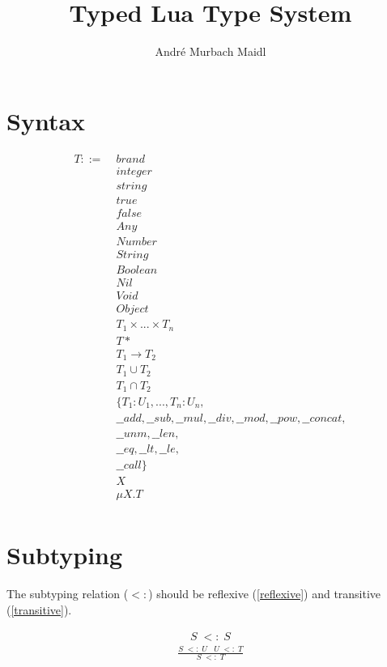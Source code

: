 \documentclass[12pt]{article}
\title{Typed Lua Type System}
\author{André Murbach Maidl}
\begin{document}
\maketitle

\section{Syntax}

\begin{align*}
T ::= \; & brand\\
& integer\\
& string\\
& true\\
& false\\
& Any\\
& Number\\
& String\\
& Boolean\\
& Nil\\
& Void\\
& Object\\
& T_1 \times ... \times T_n\\
& T*\\
& T_1 \rightarrow T_2\\
& T_1 \cup T_2\\
& T_1 \cap T_2\\
& \{ T_1:U_1, ..., T_n:U_n, \\
& \_\_add, \_\_sub, \_\_mul, \_\_div, \_\_mod, \_\_pow, \_\_concat, \\
& \_\_unm, \_\_len, \\
& \_\_eq, \_\_lt, \_\_le, \\
& \_\_call \}\\
& X\\
& \mu X.T\\
\end{align*}

\section{Subtyping}

The subtyping relation ($<:$) should be reflexive (\ref{reflexive})
and transitive (\ref{transitive}).

\begin{align}
\label{reflexive}
S \; <: \; S
\end{align}
\begin{align}
\label{transitive}
\frac{S \; <: \; U \;\;\; U\;  <: \; T}{S \; <: \; T}
\end{align}
\end{document}

